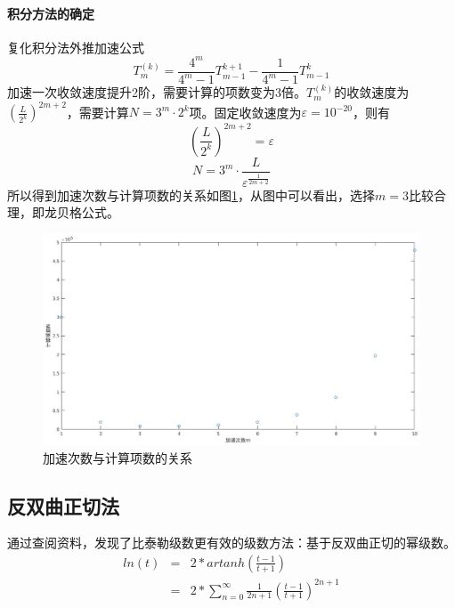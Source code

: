 \documentclass[UTF8,twocolum,titlepage]{ctexart}
\begin{document}
\paragraph{积分方法的确定}
复化积分法外推加速公式\\
$$T_m^{(k)}=\frac{4^m}{4^m-1}T_{m-1}^{k+1}-\frac{1}{4^m-1}T_{m-1}^{k}$$
加速一次收敛速度提升2阶，需要计算的项数变为3倍。$T_m^{(k)}$的收敛速度为$\left(\frac{L}{2^k}\right)^{2m+2}$，需要计算$N=3^m\cdot2^k$项。固定收敛速度为$\varepsilon=10^{-20}$，则有$$\left(\frac{L}{2^k}\right)^{2m+2}=\varepsilon$$ $$N=3^m\cdot\frac{L}{\varepsilon^{\frac{1}{2m+2}}}$$所以得到加速次数与计算项数的关系如图\ref{fig:integration_m}，从图中可以看出，选择$m=3$比较合理，即龙贝格公式。
\begin{figure}[H]
\centering
\includegraphics[width = .9\textwidth]{image/integration_m.eps}
\caption{加速次数与计算项数的关系}
\label{fig:integration_m}
\end{figure}
\subsection*{反双曲正切法}
通过查阅资料，发现了比泰勒级数更有效\cite{Logarithm_Wikipedia}的级数方法：基于反双曲正切的幂级数。
\begin{eqnarray*}
ln\left(t\right) &=&2*artanh\left(\frac{t-1}{t+1}\right)\\&=&2*\sum_{n=0}^{\infty}\frac{1}{2n+1}\left(\frac{t-1}{t+1}\right)^{2n+1}
\end{eqnarray*}
\end{document}
